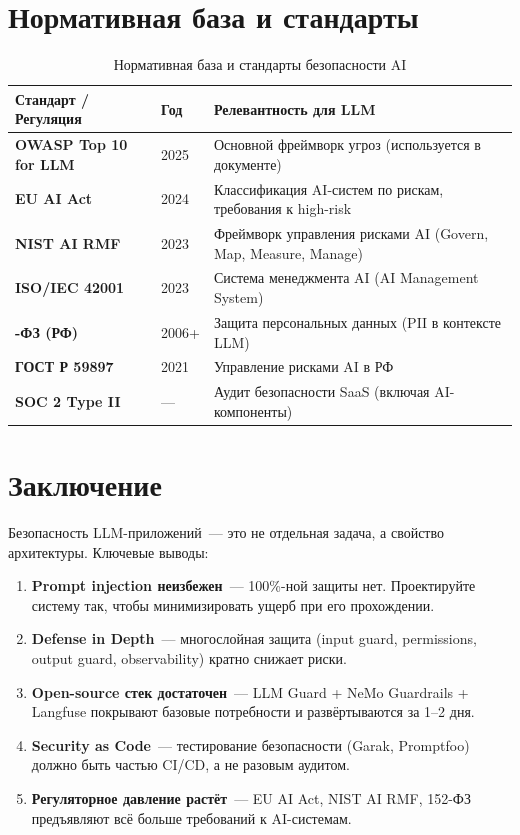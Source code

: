 \documentclass[12pt,a4paper]{article}
\begin{document}
\section{Нормативная база и стандарты}

\begin{table}[H]
\centering
\small
\renewcommand{\arraystretch}{1.3}
\begin{tabularx}{\textwidth}{>{\bfseries\sffamily}l l X}
\toprule
Стандарт / Регуляция & Год & Релевантность для LLM \\
\midrule
OWASP Top 10 for LLM & 2025 & Основной фреймворк угроз (используется в документе) \\
EU AI Act & 2024 & Классификация AI-систем по рискам, требования к high-risk \\
NIST AI RMF & 2023 & Фреймворк управления рисками AI (Govern, Map, Measure, Manage) \\
ISO/IEC 42001 & 2023 & Система менеджмента AI (AI Management System) \\
152-ФЗ (РФ) & 2006+ & Защита персональных данных (PII в контексте LLM) \\
ГОСТ Р 59897 & 2021 & Управление рисками AI в РФ \\
SOC 2 Type II & --- & Аудит безопасности SaaS (включая AI-компоненты) \\
\bottomrule
\end{tabularx}
\caption{Нормативная база и стандарты безопасности AI}
\end{table}


\section*{Заключение}

Безопасность LLM-приложений~--- это не отдельная задача, а свойство архитектуры. Ключевые выводы:

\begin{enumerate}
  \item \textbf{Prompt injection неизбежен}~--- 100\%-ной защиты нет. Проектируйте систему так, чтобы минимизировать ущерб при его прохождении.
  \item \textbf{Defense in Depth}~--- многослойная защита (input guard, permissions, output guard, observability) кратно снижает риски.
  \item \textbf{Open-source стек достаточен}~--- LLM Guard + NeMo Guardrails + Langfuse покрывают базовые потребности и развёртываются за 1--2 дня.
  \item \textbf{Security as Code}~--- тестирование безопасности (Garak, Promptfoo) должно быть частью CI/CD, а не разовым аудитом.
  \item \textbf{Регуляторное давление растёт}~--- EU AI Act, NIST AI RMF, 152-ФЗ предъявляют всё больше требований к AI-системам.
\end{enumerate}
\end{document}
